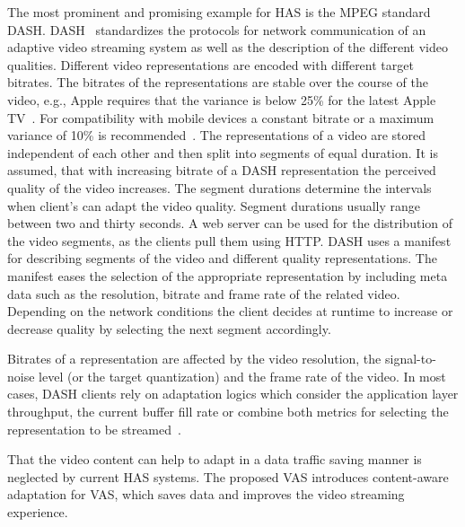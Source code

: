 The most prominent and promising example for \ac{HAS} is the \ac{MPEG} standard \ac{DASH}. %
\ac{DASH}~\cite{Stockhammer2011} standardizes the protocols for network communication of an adaptive video streaming system as well as the description of the different video qualities.  
Different video representations are encoded with different target bitrates.
The bitrates of the representations are stable over the course of the video, e.g., Apple requires that the variance is below 25\% for the latest Apple TV~\cite{Apple2016}.
For compatibility with mobile devices a constant bitrate or a maximum variance of 10\% is recommended~\cite{Apple2016}.  
The representations of a video are stored independent of each other and then split into segments of equal duration.
It is assumed, that with increasing bitrate of a \ac{DASH} representation the perceived quality of the video increases.
The segment durations determine the intervals when client's can adapt the video quality.
Segment durations usually range between two and thirty seconds. 
A web server can be used for the distribution of the video segments, as the clients pull them using \ac{HTTP}. 
\ac{DASH} uses a manifest for describing segments of the video and different quality representations. 
The manifest eases the selection of the appropriate representation by including meta data such as the resolution, bitrate and frame rate of the related video. 
Depending on the network conditions the client decides at runtime to increase or decrease quality by selecting the next segment accordingly. 

Bitrates of a representation are affected by the video resolution, the signal-to-noise level (or the target quantization) and the frame rate of the video. 
In most cases, DASH clients rely on adaptation logics which consider the application layer throughput, the current buffer fill rate or combine both metrics for selecting the representation to be streamed~\cite{Thang2014}.

That the video content can help to adapt in a data traffic saving manner is neglected by current \ac{HAS} systems.
The proposed \ac{VAS} introduces content-aware adaptation for \ac{VAS}, which saves data and improves the video streaming experience. 